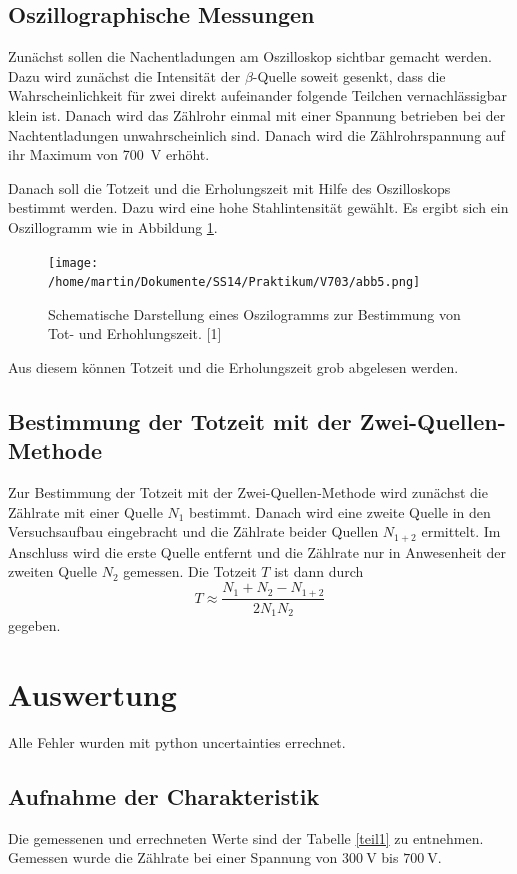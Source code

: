 \documentclass[11pt,ngerman,a4paper]{article}
\begin{document}
\subsection{Oszillographische Messungen}
Zunächst sollen die Nachentladungen am Oszilloskop sichtbar gemacht werden. Dazu wird zunächst die Intensität der $\beta$-Quelle soweit gesenkt, dass die Wahrscheinlichkeit für zwei direkt aufeinander folgende Teilchen vernachlässigbar klein ist. Danach wird das Zählrohr einmal mit einer Spannung betrieben bei der Nachtentladungen unwahrscheinlich sind. Danach wird die Zählrohrspannung auf ihr Maximum von \SI{700}{\volt} erhöht.

\noindent
Danach soll die Totzeit und die Erholungszeit mit Hilfe des Oszilloskops bestimmt werden. Dazu wird eine hohe Stahlintensität gewählt. Es ergibt sich ein Oszillogramm wie in Abbildung \ref{abb5}.
\begin{figure}[htp]
\centering
\texttt{[image: /home/martin/Dokumente/SS14/Praktikum/V703/abb5.png]}
\caption{Schematische Darstellung eines Oszilogramms zur Bestimmung von Tot- und Erhohlungszeit. [1]}
\label{abb5}
\end{figure}
Aus diesem können Totzeit und die Erholungszeit grob abgelesen werden.
\subsection{Bestimmung der Totzeit mit der Zwei-Quellen-Methode}
Zur Bestimmung der Totzeit mit der Zwei-Quellen-Methode wird zunächst die Zählrate mit einer Quelle $N_1$ bestimmt. Danach wird eine zweite Quelle in den Versuchsaufbau eingebracht und die Zählrate beider Quellen $N_{1+2}$ ermittelt. Im Anschluss wird die erste Quelle entfernt und die Zählrate nur in Anwesenheit der zweiten Quelle $N_2$ gemessen. Die Totzeit $T$ ist dann durch 
\[
T \approx \frac{N_1 + N_2 - N_{1+2}}{2N_1N_2}
\]
gegeben.
 
\section{Auswertung}
Alle Fehler wurden mit python uncertainties errechnet.
\subsection{Aufnahme der Charakteristik}
Die gemessenen und errechneten Werte sind der Tabelle \ref{teil1} zu entnehmen. Gemessen wurde die Zählrate bei einer Spannung von $\SI{300}{\volt}$ bis $\SI{700}{\volt}$.
\end{document}
